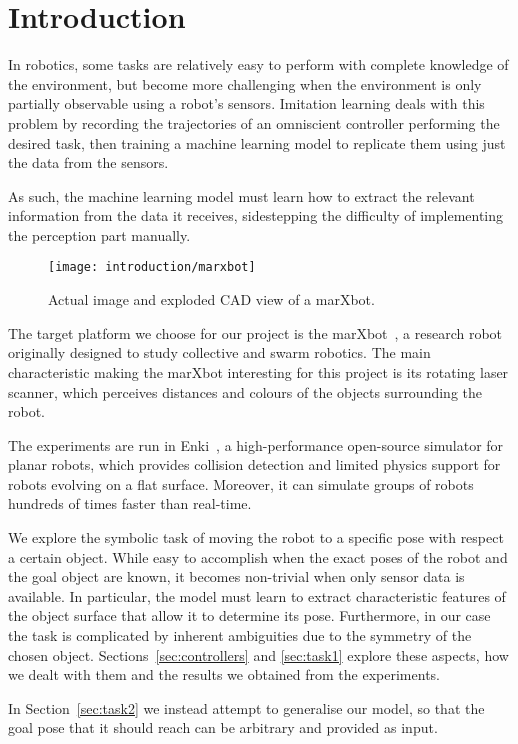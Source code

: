 \section{Introduction}

In robotics, some tasks are relatively easy to perform with complete knowledge 
of the environment, but become more challenging when the environment is only 
partially observable using a robot's sensors. Imitation learning deals with 
this problem by recording the trajectories of an omniscient controller 
performing the desired task, then training a machine learning model to 
replicate them using just the data from the sensors. 

As such, the machine learning model must learn how to extract the relevant 
information from the data it receives, sidestepping the difficulty of 
implementing the perception part manually.

\begin{figure}[htbp]
	\centerline{\texttt{[image: introduction/marxbot]}}
	\caption{Actual image and exploded CAD view of a marXbot.}
	\label{fig:marxbot}
\end{figure}

The target platform we choose for our project is the 
marXbot~\cite{bonani2010marxbot}, a research robot originally designed to study 
collective and swarm robotics. The main characteristic making the marXbot 
interesting for this project is its rotating laser scanner, which perceives 
distances and colours of the objects surrounding the robot.

The experiments are run in Enki~\cite{enki}, a high-performance open-source 
simulator for planar robots, which provides collision detection and limited 
physics support for robots evolving on a flat surface. Moreover, it can 
simulate groups of robots hundreds of times faster than real-time.

We explore the symbolic task of moving the robot to a specific pose with 
respect a certain object. While easy to accomplish when the exact poses of the 
robot and the goal object are known, it becomes non-trivial when only sensor 
data is available. In particular, the model must learn to extract 
characteristic features of the object surface that allow it to determine its 
pose. Furthermore, in our case the task is complicated by inherent ambiguities 
due to the symmetry of the chosen object. Sections~\ref{sec:controllers} and 
\ref{sec:task1} explore these aspects, how we dealt with them and the results 
we obtained from the experiments.

In Section~\ref{sec:task2} we instead attempt to generalise our model, so that 
the goal pose that it should reach can be arbitrary and provided as input.
